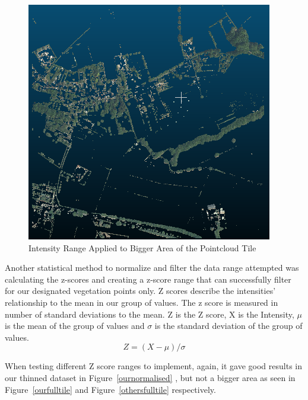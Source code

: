 \documentclass{article}
\begin{document}
\begin{figure}[H]
    \centering
    \includegraphics[width=0.5\linewidth]{Figures/fullintensity.png}
    \caption{Intensity Range Applied to Bigger Area of the Pointcloud Tile}
    \label{fullintensity}
\end{figure}

\noindent Another statistical method to normalize and filter the data range attempted was calculating the z-scores and creating a z-score range that can successfully filter for our designated vegetation points only. Z scores describe the intensities’ relationship to the mean in our group of values. The z score is measured in number of standard deviations to the mean.  Z is the Z score, X is the Intensity, $\mu$ is the mean of the group of values and $\sigma$ is the standard deviation of the group of values.\\

\[Z = (X - \mu )/ \sigma\]

\noindent When testing different Z score ranges to implement, again, it gave good results in our thinned dataset in Figure~\ref{ournormalised} , but not a bigger area as seen in Figure~\ref{ourfulltile} and Figure~\ref{othersfulltile} respectively.\\



\end{document}
